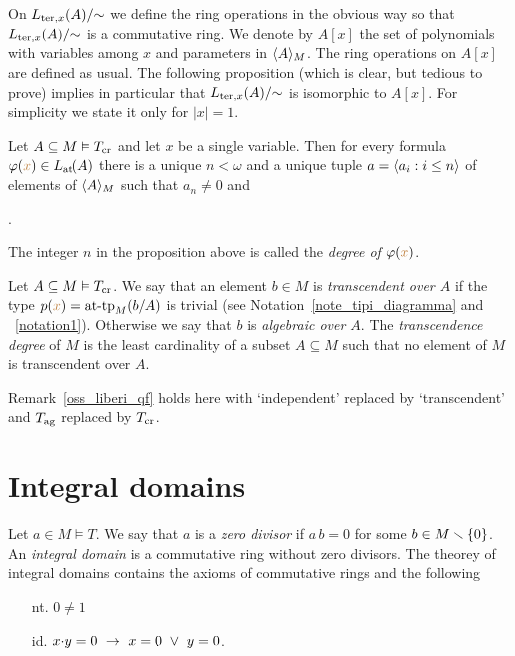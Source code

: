 \documentclass[creche.tex]{subfiles}
\begin{document}
On $L_{{\rm ter},x}(A)/\mathord{\sim}$ we define the ring operations in the obvious way so that $L_{{\rm ter},x}(A)/\mathord{\sim}$ is a commutative ring. We denote by $A[x]$ the set of polynomials with variables among $x$ and parameters in $\<A\>_M$. The ring operations on $A[x]$ are defined as usual. The following proposition (which is clear, but tedious to prove) implies in particular that $L_{{\rm ter},x}(A)/\mathord{\sim}$ is isomorphic to $A[x]$. For simplicity we state it only for $|x|=1$.

\begin{proposition}
\label{prop_formacanonicaterminiau}
Let  $A\subseteq M\models T_{\rm cr}$ and let $x$ be a single variable. Then for every formula $\phi({\mr x})\in \atL(A)$ there is a unique $n<\omega$ and a unique tuple $a=\<a_i:i\le n\>$ of elements of $\<A\>_M$ such that $a_n\neq0$ and 

.\QED
\end{proposition}

The integer $n$ in the proposition above is called the \emph{degree of $\phi({\mr x})$}.

\begin{definition} Let $A\subseteq M\models T_{\rm cr}$. We say that an element $b\in M$ is \emph{transcendent over $A$\/} if the type $p({\mr x})=\attp_M(b/A)$ is trivial (see Notation~\ref{note_tipi_diagramma} and ~\ref{notation1}). Otherwise we say that $b$ is \emph{algebraic over $A$}. The \emph{transcendence degree\/} of $M$ is the least cardinality of a subset $A\subseteq M$ such that no element of $M$ is transcendent over $A$.\QED
\end{definition}  

\begin{remark}\label{oss_liberi_cr}
Remark~\ref{oss_liberi_qf} holds here with `independent' replaced by `transcendent' and $T_{\rm ag}$ replaced by $T_{\rm cr}$.\QED
\end{remark}

\section{Integral domains}

Let $a\in M\models T$. We say that $a$ is a \emph{zero divisor} if $a\,b=0$ for some $b\in M\sm\{0\}$. An \emph{integral domain\/} is a commutative ring without zero divisors. The theorey of integral domains contains the axioms of commutative rings and the following
\begin{itemize}
\item[nt.] $0\neq 1$
\item[id.] $x\mdot y =0\ \imp\ x=0\ \vee\ y=0$.
\end{itemize}
\end{document}
